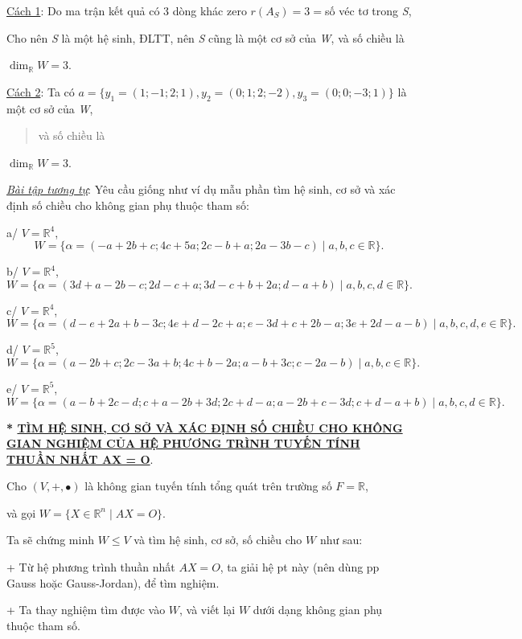 \documentclass[12pt,a4paper]{article}
\newcommand{\ul}[1]{\uline{#1}}
\begin{document}
\ul{Cách 1}: Do ma trận kết quả có 3 dòng khác zero
$r(A_S) = 3 =$số véc tơ trong
\emph{S},

Cho nên \emph{S} là một hệ sinh, ĐLTT, nên \emph{S} cũng là một cơ sở
của \emph{W}, và số chiều là

$\dim_{\mathbb{R}} W = 3$.

\ul{Cách 2}: Ta có $a = \{ y_1 = (1; -1; 2; 1), y_2 = (0; 1; 2; -2), y_3 = (0; 0; -3; 1) \}$ là
một cơ sở của \emph{W},

\begin{quote}
và số chiều là
\end{quote}

$\dim_{\mathbb{R}} W = 3$.

\emph{\ul{Bài tập tương tự}}: Yêu cầu giống như ví dụ mẫu phần tìm hệ
sinh, cơ sở và xác định số chiều cho không gian phụ thuộc tham số:

a/ $V = \mathbb{R}^4$,
\[ W = \{ \alpha = (-a + 2b + c; 4c + 5a; 2c - b + a; 2a - 3b - c) \mid a, b, c \in \mathbb{R} \}. \]

b/ $V = \mathbb{R}^4$,
\[ W = \{ \alpha = (3d + a - 2b - c; 2d - c + a; 3d - c + b + 2a; d - a + b) \mid a, b, c, d \in \mathbb{R} \}. \]

c/ $V = \mathbb{R}^4$,
\[ W = \{ \alpha = (d - e + 2a + b - 3c; 4e + d - 2c + a; e - 3d + c + 2b - a; 3e + 2d - a - b) \mid a, b, c, d, e \in \mathbb{R} \}. \]

d/ $V = \mathbb{R}^5$,
\[ W = \{ \alpha = (a - 2b + c; 2c - 3a + b; 4c + b - 2a; a - b + 3c; c - 2a - b) \mid a, b, c \in \mathbb{R} \}. \]

e/ $V = \mathbb{R}^5$,
\[ W = \{ \alpha = (a - b + 2c - d; c + a - 2b + 3d; 2c + d - a; a - 2b + c - 3d; c + d - a + b) \mid a, b, c, d \in \mathbb{R} \}. \]

\textbf{* \ul{TÌM HỆ SINH, CƠ SỞ VÀ XÁC ĐỊNH SỐ CHIỀU CHO KHÔNG GIAN
NGHIỆM CỦA HỆ PHƯƠNG TRÌNH TUYẾN TÍNH THUẦN NHẤT AX = O}}.

Cho $(V, +, \bullet)$ là không gian
tuyến tính tổng quát trên trường số
$F = \mathbb{R}$,

và gọi $W = \{ X \in \mathbb{R}^n \mid AX = O \}$.

Ta sẽ chứng minh $W \le V$ và
tìm hệ sinh, cơ sở, số chiều cho
$W$ như sau:

+ Từ hệ phương trình thuần nhất
$AX = O$, ta giải hệ pt này
(nên dùng pp Gauss hoặc Gauss-Jordan), để tìm nghiệm.

+ Ta thay nghiệm tìm được vào
$W$, và viết lại
$W$ dưới dạng không gian
phụ thuộc tham số.
\end{document}

